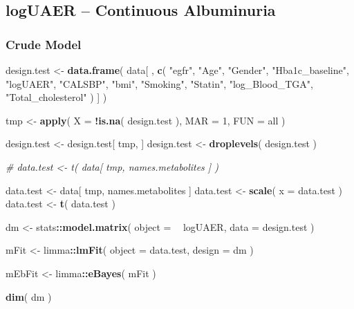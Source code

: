 \documentclass[]{article}
\newenvironment{Shaded}{\begin{snugshade}}{\end{snugshade}}
\newcommand{\CommentTok}[1]{\textcolor[rgb]{0.56,0.35,0.01}{\textit{#1}}}
\newcommand{\DataTypeTok}[1]{\textcolor[rgb]{0.13,0.29,0.53}{#1}}
\newcommand{\DecValTok}[1]{\textcolor[rgb]{0.00,0.00,0.81}{#1}}
\newcommand{\KeywordTok}[1]{\textcolor[rgb]{0.13,0.29,0.53}{\textbf{#1}}}
\newcommand{\NormalTok}[1]{#1}
\newcommand{\OperatorTok}[1]{\textcolor[rgb]{0.81,0.36,0.00}{\textbf{#1}}}
\newcommand{\StringTok}[1]{\textcolor[rgb]{0.31,0.60,0.02}{#1}}
\begin{document}
\newpage

\hypertarget{loguaer-continuous-albuminuria}{%
\subsection{logUAER -- Continuous
Albuminuria}\label{loguaer-continuous-albuminuria}}

\hypertarget{crude-model-2}{%
\subsubsection{Crude Model}\label{crude-model-2}}

\begin{Shaded}
\begin{Highlighting}[]
\NormalTok{design.test <-}\StringTok{ }
\StringTok{  }\KeywordTok{data.frame}\NormalTok{( }
\NormalTok{    data[ , }
          \KeywordTok{c}\NormalTok{( }
            \StringTok{"egfr"}\NormalTok{,}
            \StringTok{"Age"}\NormalTok{,}
            \StringTok{"Gender"}\NormalTok{, }
            \StringTok{"Hba1c_baseline"}\NormalTok{,}
            \StringTok{"logUAER"}\NormalTok{,}
            \StringTok{"CALSBP"}\NormalTok{,}
            \StringTok{"bmi"}\NormalTok{,}
            \StringTok{"Smoking"}\NormalTok{,}
            \StringTok{"Statin"}\NormalTok{,}
            \StringTok{"log_Blood_TGA"}\NormalTok{,}
            \StringTok{"Total_cholesterol"}
\NormalTok{          )}
\NormalTok{          ]}
\NormalTok{  )}

\NormalTok{tmp <-}\StringTok{ }\KeywordTok{apply}\NormalTok{( }\DataTypeTok{X =} \OperatorTok{!}\KeywordTok{is.na}\NormalTok{( design.test ), }\DataTypeTok{MAR =} \DecValTok{1}\NormalTok{, }\DataTypeTok{FUN =}\NormalTok{ all )}

\NormalTok{design.test <-}\StringTok{ }\NormalTok{design.test[ tmp, ]}
\NormalTok{design.test <-}\StringTok{ }\KeywordTok{droplevels}\NormalTok{( design.test )}

\CommentTok{# data.test <- t( data[ tmp, names.metabolites ] )}

\NormalTok{data.test <-}\StringTok{ }\NormalTok{data[ tmp, names.metabolites ]}
\NormalTok{data.test <-}\StringTok{ }\KeywordTok{scale}\NormalTok{( }\DataTypeTok{x =}\NormalTok{ data.test )}
\NormalTok{data.test <-}\StringTok{ }\KeywordTok{t}\NormalTok{( data.test )}

\NormalTok{dm <-}\StringTok{ }
\StringTok{  }\NormalTok{stats}\OperatorTok{::}\KeywordTok{model.matrix}\NormalTok{( }
    \DataTypeTok{object =} \OperatorTok{~}\StringTok{ }\NormalTok{logUAER,}
    \DataTypeTok{data =}\NormalTok{ design.test}
\NormalTok{  )}

\NormalTok{mFit <-}\StringTok{ }\NormalTok{limma}\OperatorTok{::}\KeywordTok{lmFit}\NormalTok{( }\DataTypeTok{object =}\NormalTok{ data.test, }\DataTypeTok{design =}\NormalTok{ dm )}

\NormalTok{mEbFit <-}\StringTok{ }\NormalTok{limma}\OperatorTok{::}\KeywordTok{eBayes}\NormalTok{( mFit )}

\KeywordTok{dim}\NormalTok{( dm )}
\end{Highlighting}
\end{Shaded}
\end{document}
